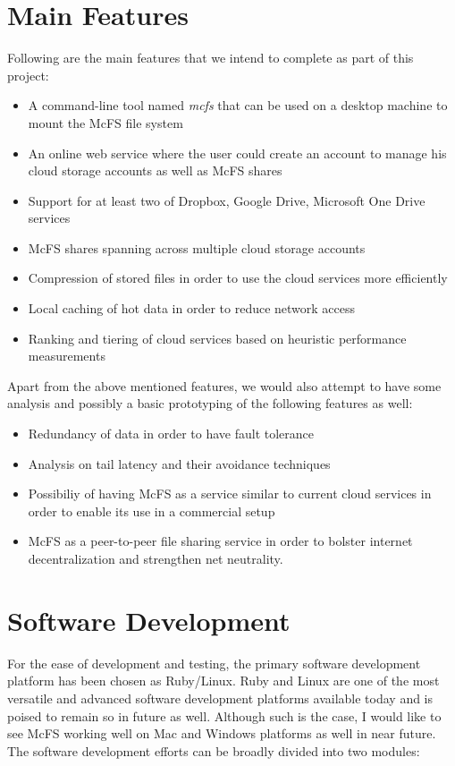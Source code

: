 \section{Main Features}
Following are the main features that we intend to complete as part of this project:
\begin{itemize}
	\item A command-line tool named \emph{mcfs} that can be used on a desktop machine to mount the McFS file system
	\item An online web service where the user could create an account to manage his cloud storage accounts as well as McFS shares
	\item Support for at least two of Dropbox, Google Drive, Microsoft One Drive services
	\item McFS shares spanning across multiple cloud storage accounts
	\item Compression of stored files in order to use the cloud services more efficiently
	\item Local caching of hot data in order to reduce network access
	\item Ranking and tiering of cloud services based on heuristic performance measurements
\end{itemize}

Apart from the above mentioned features, we would also attempt to have some analysis and possibly a basic prototyping of the following features as well:
\begin{itemize}
	\item Redundancy of data in order to have fault tolerance
	\item Analysis on tail latency and their avoidance techniques
	\item Possibiliy of having McFS as a service similar to current cloud services in order to enable its use in a commercial setup
	\item McFS as a peer-to-peer file sharing service in order to bolster internet decentralization and strengthen net neutrality.
\end{itemize}


\section{Software Development}
For the ease of development and testing, the primary software development platform has been chosen as Ruby/Linux. Ruby\cite{site:rubylang} and Linux are one of the most versatile and advanced software development platforms available today and is poised to remain so in future as well. Although such is the case, I would like to see McFS working well on Mac and Windows platforms as well in near future. The software development efforts can be broadly divided into two modules:

